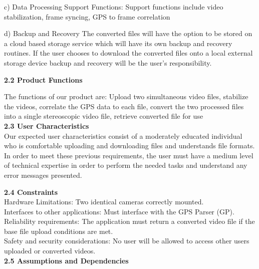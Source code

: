 \documentclass[10pt,draftclsnofoot,onecolumn]{IEEEtran}
\begin{document}
c) Data Processing Support Functions: Support functions include video stabilization, frame syncing, GPS to frame correlation
	
\vspace{2mm}

d) Backup and Recovery 
	The converted files will have the option to be stored on a cloud based storage service which will have its own backup and recovery routines. If the user chooses to download the converted files onto a local external storage device backup and recovery will be the user’s responsibility.
	
	
	\vspace{5mm}
	
	{\Medium\textbf{2.2 Product Functions}} \\
	\vspace{5mm}

	The functions of our product are: Upload two simultaneous video files, stabilize the videos, correlate the GPS data to each file, convert the two processed files into a single stereoscopic video file, retrieve converted file for use \\
		\vspace{5mm}
	{\Medium\textbf{2.3 User Characteristics}} \\
		\vspace{5mm}
Our expected user characteristics consist of a moderately educated individual who is comfortable uploading and downloading files and understands file formats. In order to meet these previous requirements, the user must have a medium level of technical expertise in order to perform the needed tasks and understand any error messages presented. \\
	 
			\vspace{5mm}

		{\Medium\textbf{2.4 Constraints}} \\
			\vspace{5mm}
Hardware Limitations: Two identical cameras correctly mounted.\\
			\vspace{2mm}
Interfaces to other applications: Must interface with the GPS Parser (GP).\\
	\vspace{2mm}
Reliability requirements: The application must return a converted video file if the base file upload conditions are met.\\
	\vspace{2mm}
Safety and security considerations: No user will be allowed to access other users uploaded or converted videos.\\
			\vspace{5mm}
		{\Medium\textbf{2.5 Assumptions and Dependencies}} \\
					\vspace{5mm}
\end{document}
